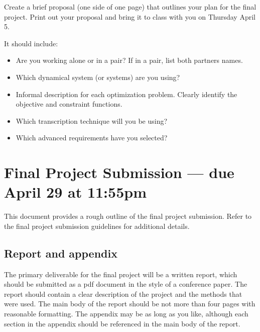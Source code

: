 Create a brief proposal (one side of one page) that outlines your plan for the
final project. Print out your proposal and bring it to class with you on Thursday April 5.

It should include:

\vspace{-0.0em} \begin{itemize}  \setlength\itemsep{0em} \setlength\itemindent{18pt}

\item Are you working alone or in a pair? If in a pair, list both partners names.

\item Which dynamical system (or systems) are you using?

\item Informal description for each optimization problem.
      Clearly identify the objective and constraint functions.

\item Which transcription technique will you be using?

\item Which advanced requirements have you selected?

\end{itemize}


\pagebreak
\section*{Final Project Submission  --- due April 29 at 11:55pm}

This document provides a rough outline of the final project submission.
Refer to the final project submission guidelines for additional details.

\subsection*{Report and appendix}
The primary deliverable for the final project will be a written report,
which should be submitted as a pdf document in the style of a conference paper.
The report should contain a clear description of the project and the methods that were used.
The main body of the report should be not more than four pages with reasonable formatting.
The appendix may be as long as you like, although each section in the appendix should be
referenced in the main body of the report.

